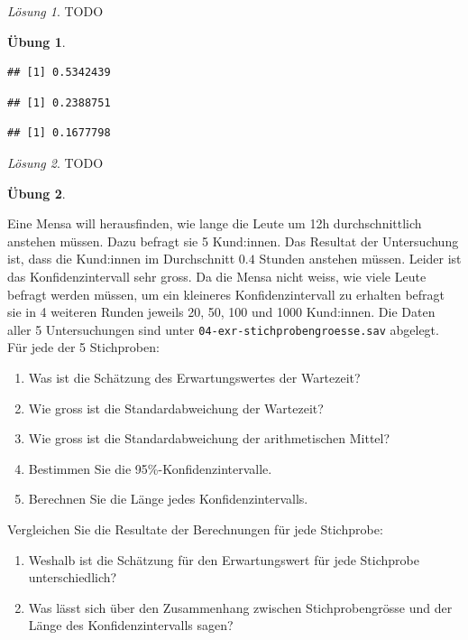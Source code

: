 \documentclass[
]{book}
\providecommand{\tightlist}{%
  \setlength{\itemsep}{0pt}\setlength{\parskip}{0pt}}
\theoremstyle{definition}
\theoremstyle{definition}
\theoremstyle{definition}
\newtheorem{exercise}{Übung}[chapter]
\theoremstyle{definition}
\theoremstyle{remark}
\newtheorem*{solution}{Lösung}
\begin{document}
\begin{solution}
TODO
\end{solution}

\begin{exercise}
\protect\hypertarget{exr:ki-approx-normal}{}\label{exr:ki-approx-normal}\leavevmode

\begin{verbatim}
## [1] 0.5342439
\end{verbatim}

\begin{verbatim}
## [1] 0.2388751
\end{verbatim}

\begin{verbatim}
## [1] 0.1677798
\end{verbatim}

\end{exercise}

\begin{solution}
TODO
\end{solution}

\begin{exercise}
\protect\hypertarget{exr:ki-mean-n-vary}{}\label{exr:ki-mean-n-vary}

Eine Mensa will herausfinden, wie lange die Leute um 12h durchschnittlich anstehen müssen. Dazu befragt sie 5 Kund:innen. Das Resultat der Untersuchung ist, dass die Kund:innen im Durchschnitt \(0.4\) Stunden anstehen müssen. Leider ist das Konfidenzintervall sehr gross. Da die Mensa nicht weiss, wie viele Leute befragt werden müssen, um ein kleineres Konfidenzintervall zu erhalten befragt sie in 4 weiteren Runden jeweils 20, 50, 100 und 1000 Kund:innen. Die Daten aller 5 Untersuchungen sind unter \texttt{04-exr-stichprobengroesse.sav} abgelegt. Für jede der 5 Stichproben:

\begin{enumerate}
\def\labelenumi{\alph{enumi}.}
\tightlist
\item
  Was ist die Schätzung des Erwartungswertes der Wartezeit?
\item
  Wie gross ist die Standardabweichung der Wartezeit?
\item
  Wie gross ist die Standardabweichung der arithmetischen Mittel?
\item
  Bestimmen Sie die 95\%-Konfidenzintervalle.
\item
  Berechnen Sie die Länge jedes Konfidenzintervalls.
\end{enumerate}

Vergleichen Sie die Resultate der Berechnungen für jede Stichprobe:

\begin{enumerate}
\def\labelenumi{\alph{enumi}.}
\setcounter{enumi}{5}
\tightlist
\item
  Weshalb ist die Schätzung für den Erwartungswert für jede Stichprobe unterschiedlich?
\item
  Was lässt sich über den Zusammenhang zwischen Stichprobengrösse und der Länge des Konfidenzintervalls sagen?
\end{enumerate}

\end{exercise}
\end{document}
